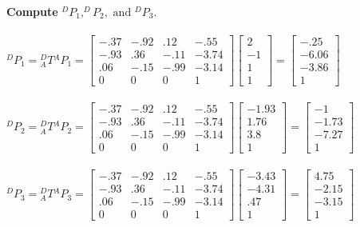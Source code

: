 \documentclass{article}
\begin{document}
\textbf{Compute} $^DP_1, ^DP_2, \text{ and } {}^DP_3$.\\\\
$^DP_1={}^D_AT{}^AP_1=\begin{bmatrix}
-.37 & -.92 & .12 & -.55\\
-.93 & .36 & -.11 & -3.74\\
.06 & -.15 & -.99 & -3.14\\
0  &  0  &  0  &  1  
\end{bmatrix}\begin{bmatrix}
2\\
-1\\
1\\
1
\end{bmatrix}=\begin{bmatrix}
-.25\\
-6.06\\
-3.86\\
1
\end{bmatrix}$\\\\
$^DP_2={}^D_AT{}^AP_2=\begin{bmatrix}
-.37 & -.92 & .12 & -.55\\
-.93 & .36 & -.11 & -3.74\\
.06 & -.15 & -.99 & -3.14\\
0  &  0  &  0  &  1  
\end{bmatrix}\begin{bmatrix}
-1.93\\
1.76\\
3.8\\
1
\end{bmatrix}=\begin{bmatrix}
-1\\
-1.73\\
-7.27\\
1
\end{bmatrix}$\\\\
$^DP_3={}^D_AT{}^AP_3=\begin{bmatrix}
-.37 & -.92 & .12 & -.55\\
-.93 & .36 & -.11 & -3.74\\
.06 & -.15 & -.99 & -3.14\\
0  &  0  &  0  &  1  
\end{bmatrix}\begin{bmatrix}
-3.43\\
-4.31\\
.47\\
1
\end{bmatrix}=\begin{bmatrix}
4.75\\
-2.15\\
-3.15\\
1
\end{bmatrix}$\\\\
\end{document}
